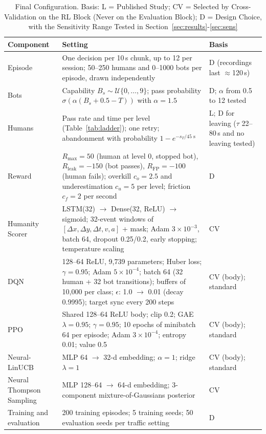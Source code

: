 \documentclass{ieeetj}
\begin{document}
\begin{table}[!t]
\caption{Final Configuration. Basis: L = Published Study; CV = Selected by Cross-Validation on the RL Block (Never on the Evaluation Block); D = Design Choice, with the Sensitivity Range Tested in Section~\ref{sec:results}-\ref{sec:sens}}
\label{tab:config}
\centering
\footnotesize
\setlength{\tabcolsep}{4pt}
\begin{tabular}{p{}p{}p{}}
\toprule
\textbf{Component} & \textbf{Setting} & \textbf{Basis} \\
\midrule
Episode & One decision per 10\,s chunk, up to 12 per session; 50--250 humans and 0--1000 bots per episode, drawn independently & D (recordings last $\approx$120\,s) \\
Bots & Capability $B_s\sim\mathcal U\{0,\dots,9\}$; pass probability $\sigma(\alpha(B_s+0.5-T))$ with $\alpha=1.5$ & D; $\alpha$ from 0.5 to 12 tested \\
Humans & Pass rate and time per level (Table~\ref{tab:ladder}); one retry; abandonment with probability $1-e^{-s_T/45\text{ s}}$ & L; D for leaving ($\tau$ 22--80\,s and no leaving tested) \\
Reward & $R_{\max}=50$ (human at level 0, stopped bot), $R_{\text{leak}}=-150$ (bot passes), $R_{\text{FP}}=-100$ (human fails); overkill $c_o=2.5$ and underestimation $c_u=5$ per level; friction $c_f=2$ per second & D \\
\midrule
Humanity Scorer & LSTM(32) $\rightarrow$ Dense(32, ReLU) $\rightarrow$ sigmoid; 32-event windows of $[\Delta x,\Delta y,\Delta t,v,a]$ + mask; Adam $3\!\times\!10^{-3}$, batch 64, dropout 0.25/0.2, early stopping; temperature scaling & CV \\
DQN & 128--64 ReLU, 9{,}739 parameters; Huber loss; $\gamma=0.95$; Adam $5\!\times\!10^{-4}$; batch 64 (32 human + 32 bot transitions); buffers of 10{,}000 per class; $\epsilon$: 1.0 $\rightarrow$ 0.01 (decay 0.9995); target sync every 200 steps & CV (body); standard \cite{mnih_dqn_2015} \\
PPO & Shared 128--64 ReLU body; clip 0.2; GAE $\lambda=0.95$; $\gamma=0.95$; 10 epochs of minibatch 64 per episode; Adam $3\!\times\!10^{-4}$; entropy 0.01; value 0.5 & CV (body); standard \cite{schulman_ppo_2017,schulman_gae_2016} \\
Neural-LinUCB & MLP 64 $\rightarrow$ 32-d embedding; $\alpha=1$; ridge $\lambda=1$ & CV (body); standard \cite{li_linucb_2010,riquelme_2018} \\
Neural Thompson Sampling & MLP 128--64 $\rightarrow$ 64-d embedding; 3-component mixture-of-Gaussians posterior & CV \cite{riquelme_2018,hong_mixts_2022} \\
\midrule
Training and evaluation & 200 training episodes; 5 training seeds; 50 evaluation seeds per traffic setting & D \\
\bottomrule
\end{tabular}
\end{table}
\end{document}
